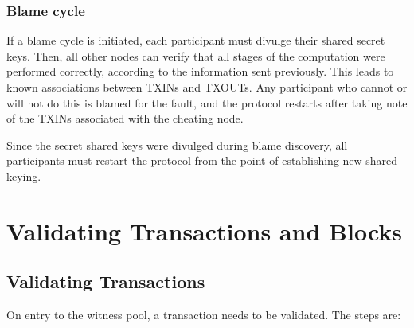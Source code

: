 \documentclass[a4paper, 10pt, conference]{ieeeconf}
\begin{document}
\subsubsection{Blame cycle} If a blame cycle is initiated, each participant must divulge their shared secret keys. Then, all other nodes can verify that all stages of the computation were performed correctly, according to the information sent previously. This leads to known associations between TXINs and TXOUTs. Any participant who cannot or will not do this is blamed for the fault, and the protocol restarts after taking note of the TXINs associated with the cheating node.

Since the secret shared keys were divulged during blame discovery, all participants must restart the protocol from the point of establishing new shared keying.

\section{Validating Transactions and Blocks}\label{tx_processing}

\subsection{Validating Transactions}
On entry to the witness pool, a transaction needs to be validated. The steps are:
\end{document}

